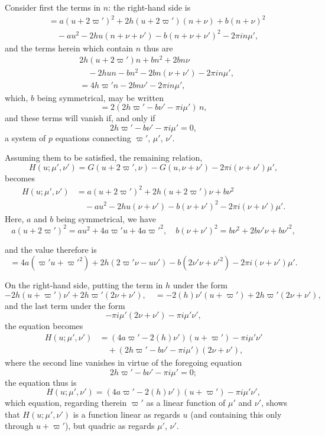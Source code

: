 \documentclass[11pt,a4paper]{article}
\begin{document}
Consider first the terms in $n$: the right-hand side is
\begin{align*}
  & = a(u + 2\varpi')^{2} + 2h(u + 2\varpi')(n + \nu) + b(n + \nu)^{2} \\
  & \quad - au^{2} - 2hu(n + \nu + \nu') - b(n + \nu + \nu')^{2}
        - 2\pi i n \mu',
\end{align*}
and the terms herein which contain $n$ thus are
\begin{align*}
  & 2h(u + 2\varpi')n + bn^{2} + 2bn\nu \\
  & \quad - 2hun - bn^{2} - 2bn(\nu + \nu') - 2\pi i n \mu', \\
  & = 4h\varpi' n - 2bn\nu' - 2\pi i n \mu',
\end{align*}
which, $b$ being symmetrical, may be written
\[
  = 2(2h\varpi' - b\nu' - \pi i \mu')\,n,
\]
and these terms will vanish if, and only if
\[
  2h\varpi' - b\nu' - \pi i \mu' = 0,
\]
a system of $p$ equations connecting $\varpi'$, $\mu'$, $\nu'$.

Assuming them to be satisfied, the remaining relation,
\[
  H(u; \mu', \nu') = G(u + 2\varpi', \nu) - G(u, \nu + \nu')
   - 2\pi i (\nu + \nu') \mu',
\]
becomes
\begin{align*}
  H(u; \mu', \nu') & = a(u + 2\varpi')^{2} + 2h(u + 2\varpi')\nu + b\nu^{2} \\
   & \quad - au^{2} - 2hu(\nu + \nu') - b(\nu + \nu')^{2}
       - 2\pi i (\nu + \nu') \mu'.
\end{align*}
Here, $a$ and $b$ being symmetrical, we have
\[
  a(u + 2\varpi')^{2} = au^{2} + 4a\varpi' u + 4a\varpi'^{2}, \quad
  b(\nu + \nu')^{2} = b\nu^{2} + 2b\nu'\nu + b\nu'^{2},
\]

and the value therefore is
\[
  = 4a(\varpi' u + \varpi'^{2}) + 2h(2\varpi'\nu - u\nu')
    - b(2\nu'\nu + \nu'^{2}) - 2\pi i (\nu + \nu') \mu'.
\]

On the right-hand side, putting the term in $h$ under the form
\[
  -2h(u + \varpi')\nu' + 2h\varpi'(2\nu + \nu'),
  \quad = -2(h)\nu'(u + \varpi') + 2h\varpi'(2\nu + \nu'),
\]
and the last term under the form
\[
  -\pi i \mu' (2\nu + \nu') - \pi i \mu' \nu',
\]
the equation becomes
\begin{align*}
  H(u; \mu', \nu') & = (4a\varpi' - 2(h)\nu')(u + \varpi') - \pi i \mu' \nu' \\
   & \quad + (2h\varpi' - b\nu' - \pi i \mu')(2\nu + \nu'),
\end{align*}
where the second line vanishes in virtue of the foregoing equation
\[
  2h\varpi' - b\nu' - \pi i \mu' = 0;
\]
the equation thus is
\[
  H(u; \mu', \nu') = (4a\varpi' - 2(h)\nu')(u + \varpi') - \pi i \mu' \nu',
\]
which equation, regarding therein $\varpi'$ as a linear function of $\mu'$
and $\nu'$, shows that $H(u; \mu', \nu')$ is a function linear as regards
$u$ (and containing this only through $u + \varpi'$), but quadric as
regards $\mu'$, $\nu'$.
\end{document}
